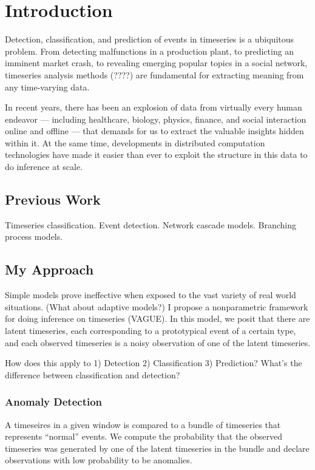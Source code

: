 \chapter{Introduction}
Detection, classification, and prediction of events in timeseries is a ubiquitous problem. From detecting malfunctions in a production plant, to predicting an imminent market crash, to revealing emerging popular topics in a social network, timeseries analysis methods (????) are fundamental for extracting meaning from any time-varying data.

In recent years, there has been an explosion of data from virtually every human endeavor --- including healthcare, biology, physics, finance, and social interaction online and offline --- that demands for us to extract the valuable insights hidden within it. At the same time, developments in distributed computation technologies have made it easier than ever to exploit the structure in this data to do inference at scale.

\section{Previous Work}
Timeseries classification. Event detection. Network cascade models. Branching process models.

\section{My Approach}
Simple models prove ineffective when exposed to the vast variety of real world situations. (What about adaptive models?) I propose a nonparametric framework for doing inference on timeseries (VAGUE). In this model, we posit that there are latent timeseries, each corresponding to a prototypical event of a certain type, and each observed timeseries is a noisy observation of one of the latent timeseries.

How does this apply to 1) Detection 2) Classification 3) Prediction? What's the difference between classification and detection?

\subsection{Anomaly Detection}
A timeseires in a given window is compared to a bundle of timeseries that represents ``normal'' events. We compute the probability that the observed timeseries was generated by one of the latent timeseries in the bundle and declare observations with low probability to be anomalies.

